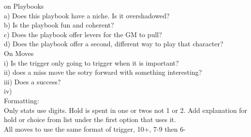 \documentclass{tufte-book}
\begin{document}
on Playbooks\\
a) Does this playbook have a niche. Is it overshadowed?\\
b) Is the playbook fun and coherent?\\
c) Does the playbook offer levers for the GM to pull?\\
d) Does the playbook offer a second, different way to play that character?\\

On Moves\\
i) Is the trigger only going to trigger when it is important?\\
ii) does a miss move the sotry forward with something interesting?\\
iii) Does a success?\\
iv) \\

Formatting:\\
Only stats use digits. Hold is spent in one or twos not 1 or 2. Add explanation for hold or choice from list under the first option that uses it.\\
All moves to use the same format of trigger, 10+, 7-9 then 6-\\









\backmatter




\printindex[stuff]

\printindex
\end{document}
